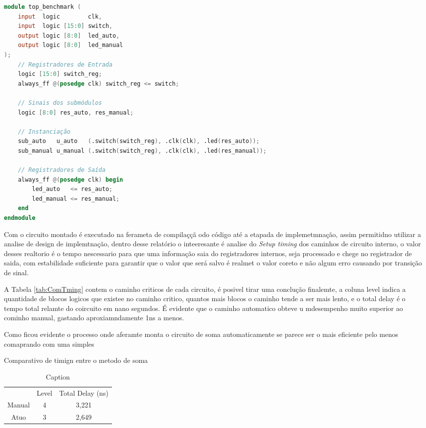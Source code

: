 \begin{lstlisting}[language=Verilog, caption={Modulo em SystemVerilog do Subtração para comaprativo de desempenho manula}, label={lst:sub_manula}]
module top_benchmark (
    input  logic        clk,
    input  logic [15:0] switch,
    output logic [8:0]  led_auto,
    output logic [8:0]  led_manual
);
    // Registradores de Entrada
    logic [15:0] switch_reg;
    always_ff @(posedge clk) switch_reg <= switch;

    // Sinais dos submódulos
    logic [8:0] res_auto, res_manual;

    // Instanciação
    sub_auto   u_auto   (.switch(switch_reg), .clk(clk), .led(res_auto));
    sub_manual u_manual (.switch(switch_reg), .clk(clk), .led(res_manual));

    // Registradores de Saída
    always_ff @(posedge clk) begin
        led_auto   <= res_auto;
        led_manual <= res_manual;
    end
endmodule
\end{lstlisting}

Com o circuito montado é executado na ferameta de compilaççã odo código até a etapada de implemetmnação, assim permitidno utilizar a analise de design de implemtnação, dentro desse relatório o inteeresante é analise do \textit{Setup timing} dos caminhos de circuito interno, o valor desses realtorio é o tempo nescessario para que uma informação saia do registradores internos, seja processado e chege no registrador de saida, com estabilidade suficiente para garantir que o valor que será salvo é realmet o valor coreto e não algum erro causando por transição de sinal.

A Tabela \ref{tab:ComTming} contem o caminho criticos de cada circuito, é posivel tirar uma conclução finalemte, a coluna level indica a quantidade de blocos logicos que existee no caminho critico, quantos mais blocos o caminho tende a ser mais lento, e o total delay é o tempo total relamte do coircuito em nano segundos. É evidente que o caminho automatico obteve u mdesempenho  muito superior ao cominho manual, gastando aproxiamndamente 1ns a menos.

Como ficou evidente o processo onde  aferamte monta o circuito de soma automaticamente se parece ser  o mais eficiente pelo menos comaprando com uma simples 

\begin{table}[!htb]
\caption{Comparativo de timign entre o metodo de soma\label{tab:ComTming}}
    \centering
    \begin{tabular}{ccc}
         & Level & Total Delay (ns) \\
        Manual & 4 & 3,221 \\
        Atuo & 3 & 2,649 \\
    \end{tabular}
    \caption{Caption}
    \label{tab:my_label}
\end{table}



